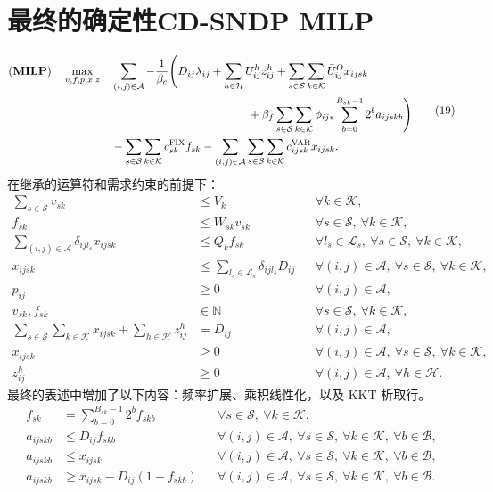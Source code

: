 \documentclass{article}
\begin{document}
\section*{最终的确定性CD-SNDP MILP}
\begin{equation}
\begin{aligned}
(\mathbf{MILP})\quad \max_{v,f,p,x,z}\quad
&\sum_{(i,j)\in\mathcal A}-\frac{1}{\beta_c}\Biggl(
D_{ij}\lambda_{ij}+\sum_{h\in\mathcal H}U_{ij}^{h}z_{ij}^{h}
+\sum_{s\in\mathcal S}\sum_{k\in\mathcal K}\bar U_{ij}^{O}x_{ijsk}\\
&\hspace{42mm}+\beta_f\sum_{s\in\mathcal S}\sum_{k\in\mathcal K}\phi_{ijs}
\sum_{b=0}^{B_{sk}-1}2^b a_{ijskb}\Biggr)\\
&-\sum_{s\in\mathcal S}\sum_{k\in\mathcal K}c_{sk}^{\mathrm{FIX}}f_{sk}
-\sum_{(i,j)\in\mathcal A}\sum_{s\in\mathcal S}\sum_{k\in\mathcal K}c_{ijsk}^{\mathrm{VAR}}x_{ijsk}.
\end{aligned}\tag{19}
\end{equation}
在继承的运算符和需求约束的前提下：
\begin{align}
\sum_{s\in\mathcal S}v_{sk}&\leq V_k
&&\forall k\in\mathcal K,\tag{2}\\
f_{sk}&\leq W_{sk}v_{sk}
&&\forall s\in\mathcal S,\ \forall k\in\mathcal K,\tag{3}\\
\sum_{(i,j)\in\mathcal A}\delta_{ijl_s}x_{ijsk}&\leq Q_k f_{sk}
&&\forall l_s\in\mathcal L_s,\ \forall s\in\mathcal S,\ \forall k\in\mathcal K,\tag{4}\\
x_{ijsk}&\leq\sum_{l_s\in\mathcal L_s}\delta_{ijl_s}D_{ij}
&&\forall(i,j)\in\mathcal A,\ \forall s\in\mathcal S,\ \forall k\in\mathcal K,\tag{5}\\
p_{ij}&\geq0
&&\forall(i,j)\in\mathcal A,\tag{6}\\
v_{sk},f_{sk}&\in\mathbb N
&&\forall s\in\mathcal S,\ \forall k\in\mathcal K,\tag{7}\\
\sum_{s\in\mathcal S}\sum_{k\in\mathcal K}x_{ijsk}
+\sum_{h\in\mathcal H}z_{ij}^{h}&=D_{ij}
&&\forall(i,j)\in\mathcal A,\tag{9}\\
x_{ijsk}&\geq0
&&\forall(i,j)\in\mathcal A,\ \forall s\in\mathcal S,\ \forall k\in\mathcal K,\tag{10}\\
z_{ij}^{h}&\geq0
&&\forall(i,j)\in\mathcal A,\ \forall h\in\mathcal H.\tag{11}
\end{align}
最终的表述中增加了以下内容：频率扩展、乘积线性化，以及 KKT 析取行。
\begin{align}
f_{sk}&=\sum_{b=0}^{B_{sk}-1}2^b f_{skb}
&&\forall s\in\mathcal S,\ \forall k\in\mathcal K,\tag{20}\\
a_{ijskb}&\leq D_{ij}f_{skb}
&&\forall(i,j)\in\mathcal A,\ \forall s\in\mathcal S,\ \forall k\in\mathcal K,\ \forall b\in\mathcal B,\tag{21}\\
a_{ijskb}&\leq x_{ijsk}
&&\forall(i,j)\in\mathcal A,\ \forall s\in\mathcal S,\ \forall k\in\mathcal K,\ \forall b\in\mathcal B,\tag{22}\\
a_{ijskb}&\geq x_{ijsk}-D_{ij}(1-f_{skb})
&&\forall(i,j)\in\mathcal A,\ \forall s\in\mathcal S,\ \forall k\in\mathcal K,\ \forall b\in\mathcal B.\tag{23}
\end{align}
\end{document}
